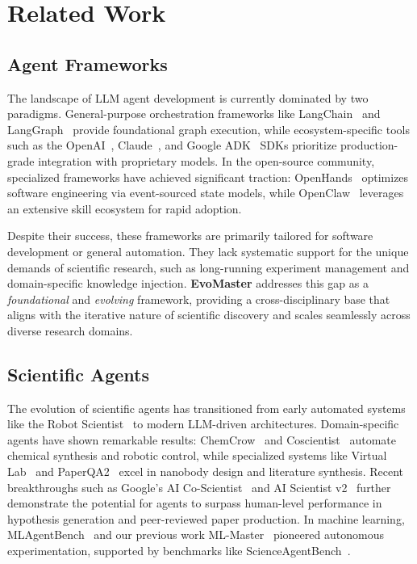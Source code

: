 \documentclass[11pt, a4paper, logo, copyright, nonumbering]{cls/Sci}
\begin{document}
\section{Related Work}
\label{sec:related}

\subsection{Agent Frameworks}

The landscape of LLM agent development is currently dominated by two paradigms. General-purpose orchestration frameworks like LangChain~\citep{langchain2025} and LangGraph~\citep{langgraph2025} provide foundational graph execution, while ecosystem-specific tools such as the OpenAI~\citep{openai2025agents}, Claude~\citep{anthropic2025claude}, and Google ADK~\citep{google2025adk} SDKs prioritize production-grade integration with proprietary models. In the open-source community, specialized frameworks have achieved significant traction: OpenHands~\citep{wang2025openhands, wang2025openhands_sdk} optimizes software engineering via event-sourced state models, while OpenClaw~\citep{steinberger2025openclaw} leverages an extensive skill ecosystem for rapid adoption.

Despite their success, these frameworks are primarily tailored for software development or general automation. They lack systematic support for the unique demands of scientific research, such as long-running experiment management and domain-specific knowledge injection. \textbf{EvoMaster} addresses this gap as a \textit{foundational} and \textit{evolving} framework, providing a cross-disciplinary base that aligns with the iterative nature of scientific discovery and scales seamlessly across diverse research domains.

\subsection{Scientific Agents}

The evolution of scientific agents has transitioned from early automated systems like the Robot Scientist~\citep{king2009automation} to modern LLM-driven architectures. Domain-specific agents have shown remarkable results: ChemCrow~\citep{bran2024augmenting} and Coscientist~\citep{boiko2023autonomous} automate chemical synthesis and robotic control, while specialized systems like Virtual Lab~\citep{swansonvirtuallab} and PaperQA2~\citep{zheng2025paperqa} excel in nanobody design and literature synthesis. Recent breakthroughs such as Google’s AI Co-Scientist~\citep{gottweis2025coscientist} and AI Scientist v2~\citep{aiscientistv2} further demonstrate the potential for agents to surpass human-level performance in hypothesis generation and peer-reviewed paper production. In machine learning, MLAgentBench~\citep{huang2023mlagentbench} and our previous work ML-Master~\citep{sjtu2025mlmaster} pioneered autonomous experimentation, supported by benchmarks like ScienceAgentBench~\citep{chen2025scienceagentbench}.
\end{document}
